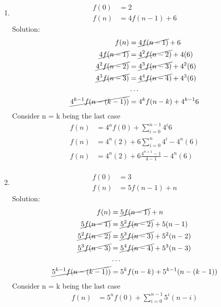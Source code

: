 \documentclass{article}
\begin{document}
\begin{enumerate}
\item
  \begin{align*}
    f(0) &= 2\\
    f(n) &= 4f(n-1) + 6
  \end{align*}
  Solution:
  \begin{align*}
    f(n) &= \cancel{4f(n-1)}+6\\ 
    \cancel{4f(n-1)} &= \cancel{4^2f(n-2)} +4(6)\\ 
    \cancel{4^2f(n-2)} &= \cancel{4^3f(n-3)} +4^2(6)\\ 
    \cancel{4^3f(n-3)} &= \cancel{4^4f(n-4)} +4^3(6)\\ 
    &\ldots\\
    \cancel{4^{k-1}f(n-(k-1))} &= 4^kf(n-k)+4^{k-1}6
  \end{align*}
  Consider n = k being the last case
  \begin{align*}
    f(n) &= 4^nf(0)+ \sum_{i=0}^{n-1}4^i6 \\
    f(n) &= 4^n(2)+ 6\sum_{i=0}^{n}4^i - 4^n(6) \\
    f(n) &= 4^n(2)+ 6\frac{4^{n+1} - 1}{4-1} - 4^n(6) \\
  \end{align*}

\item
  \begin{align*}
    f(0) &= 3\\
    f(n) &= 5f(n-1) + n
  \end{align*}
  Solution:
  \begin{align*}
    f(n) &= \cancel{5f(n-1)}+n\\ 
    \cancel{5f(n-1)} &= \cancel{5^2f(n-2)} +5(n-1)\\
    \cancel{5^2f(n-2)} &= \cancel{5^3f(n-3)} +5^2(n-2)\\
    \cancel{5^3f(n-3)} &= \cancel{5^4f(n-4)} +5^3(n-3)\\
    &\ldots\\
    \cancel{5^{k-1} f(n-(k-1))} &= {5^kf(n-k)} +5^{k-1}(n-(k-1))\\
  \end{align*}
  Consider n = k being the last case
  \begin{align*}
    f(n) &= {5^nf(0)} + \sum_{i=0}^{n-1}5^i(n-i) \\
  \end{align*}

\end{enumerate}
\end{document}
